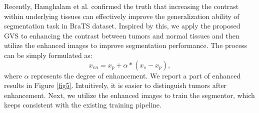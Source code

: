 \documentclass[journal,twoside,web]{ieeecolor}
\begin{document}
Recently, Hamghalam et al. \cite{hamghalam2020high} confirmed the truth that increasing the contrast within underlying tissues can effectively improve the generalization ability of segmentation task in BraTS dataset. Inspired by this, we apply the proposed GVS to enhancing the contrast between tumors and normal tissues and then utilize the enhanced images to improve segmentation performance. 
The process can be simply formulated as:
\begin{equation}
	x_{en} = x_p + \alpha * (x_s - x_p),
\end{equation} 
where $\alpha$ represents the degree of enhancement. We report a part of enhanced results in Figure \ref{fig5}. Intuitively, it is easier to distinguish tumors after enhancement. Next, we utilize the enhanced images to train the segmentor, which keeps consistent with the existing training pipeline. 
\end{document}
